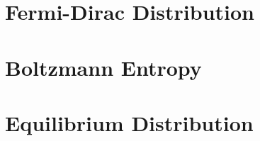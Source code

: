 \documentclass[10pt]{report}
\begin{document}
\section{Fermi-Dirac Distribution}
\clearpage

\section{Boltzmann Entropy}
\clearpage

\section{Equilibrium Distribution}
\clearpage
\printbibliography
\end{document}

